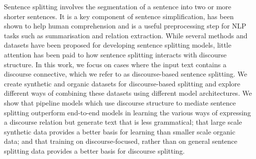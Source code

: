 Sentence splitting involves the segmentation of a sentence into two or more shorter sentences. It is a key component of sentence simplification, has been shown to help human comprehension and is a useful preprocessing step for NLP tasks such as summarisation and relation extraction. While several methods and datasets have been proposed for developing sentence splitting models, little attention has been paid to how sentence splitting interacts with discourse structure. In this work, we focus on cases where the input text contains a discourse connective, which we refer to as discourse-based sentence splitting. We create synthetic and organic datasets for discourse-based splitting and explore different ways of combining these datasets using different model architectures. We show that pipeline models which use discourse structure to mediate sentence splitting outperform end-to-end models in learning the various ways of expressing a discourse relation but generate text that is less grammatical; that large scale synthetic data provides a better basis for learning than smaller scale organic data; and that training on discourse-focused, rather than on general sentence splitting data provides a better basis for discourse splitting.

